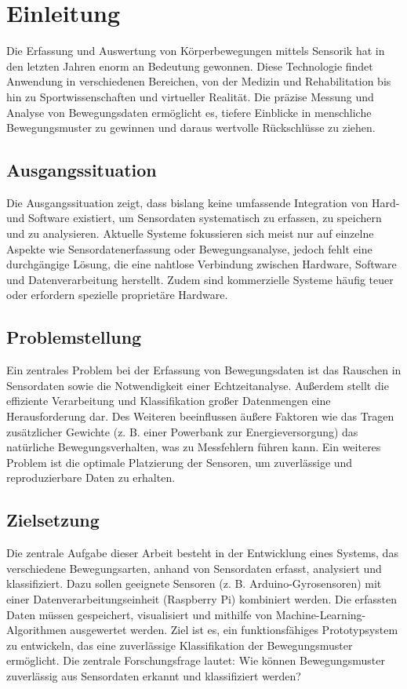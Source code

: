 \chapter{Einleitung}
Die Erfassung und Auswertung von Körperbewegungen mittels Sensorik hat in den letzten Jahren enorm an Bedeutung gewonnen. Diese Technologie findet Anwendung in verschiedenen Bereichen, von der Medizin und Rehabilitation bis hin zu Sportwissenschaften und virtueller Realität. Die präzise Messung und Analyse von Bewegungsdaten ermöglicht es, tiefere Einblicke in menschliche Bewegungsmuster zu gewinnen und daraus wertvolle Rückschlüsse zu ziehen.

\section{Ausgangssituation}
Die Ausgangssituation zeigt, dass bislang keine umfassende Integration von Hard-
und Software existiert, um Sensordaten systematisch zu erfassen, zu speichern und zu
analysieren. Aktuelle Systeme fokussieren sich meist nur auf einzelne Aspekte wie Sensordatenerfassung oder Bewegungsanalyse, jedoch fehlt eine durchgängige Lösung, die eine nahtlose Verbindung zwischen Hardware, Software und Datenverarbeitung herstellt. Zudem sind kommerzielle Systeme häufig teuer oder erfordern spezielle proprietäre Hardware.

\section{Problemstellung}
Ein zentrales Problem bei der Erfassung von Bewegungsdaten ist das Rauschen in Sensordaten sowie die Notwendigkeit einer Echtzeitanalyse. Außerdem stellt die effiziente Verarbeitung und Klassifikation großer Datenmengen eine Herausforderung dar. Des Weiteren beeinflussen äußere Faktoren wie das Tragen zusätzlicher Gewichte (z. B. einer Powerbank zur Energieversorgung) das natürliche Bewegungsverhalten, was zu Messfehlern führen kann. Ein weiteres Problem ist die optimale Platzierung der Sensoren, um zuverlässige und reproduzierbare Daten zu erhalten.

\section{Zielsetzung}
Die zentrale Aufgabe dieser Arbeit besteht in der Entwicklung eines Systems, das verschiedene Bewegungsarten, anhand von Sensordaten erfasst, analysiert und klassifiziert. Dazu sollen geeignete Sensoren (z. B. Arduino-Gyrosensoren) mit einer Datenverarbeitungseinheit (Raspberry Pi) kombiniert werden. Die erfassten Daten müssen gespeichert, visualisiert und mithilfe von Machine-Learning-Algorithmen ausgewertet werden. Ziel ist es, ein funktionsfähiges Prototypsystem zu entwickeln, das eine zuverlässige Klassifikation der Bewegungsmuster ermöglicht. Die zentrale Forschungsfrage lautet: Wie können Bewegungsmuster zuverlässig aus Sensordaten erkannt und klassifiziert werden?

